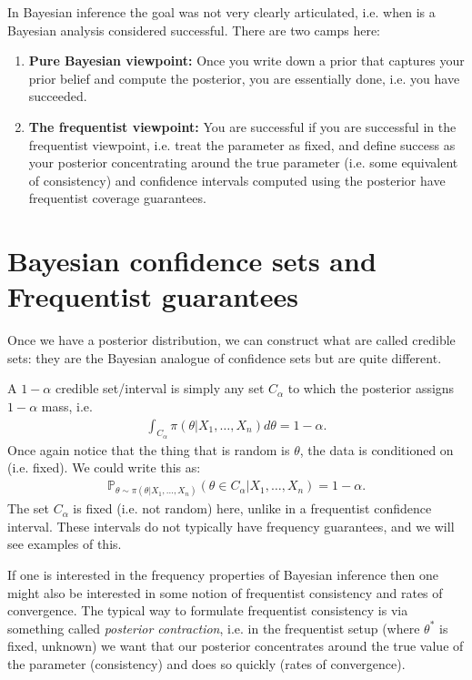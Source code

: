 \documentclass[twoside,12pt]{article}
\begin{document}
In Bayesian inference the goal was not very clearly articulated, i.e. when is a Bayesian analysis considered successful. There are two camps here:
\begin{enumerate}
\item {\bf Pure Bayesian viewpoint: } Once you write down a prior that captures your prior belief and compute the posterior, you are essentially done, i.e. you have succeeded.
\item {\bf The frequentist viewpoint: } You are successful if you are successful in the frequentist viewpoint, i.e. treat  the parameter as fixed, and define success as your posterior concentrating around the true parameter (i.e. some equivalent of consistency) and confidence intervals computed using the posterior have frequentist coverage guarantees.
\end{enumerate}

\section{Bayesian confidence sets and Frequentist guarantees}
Once we have a posterior distribution, we can construct what are called credible sets: they are the Bayesian analogue of confidence sets but are quite different.

A $1 - \alpha$ credible set/interval is simply any set $C_\alpha$ to which the posterior assigns $1 - \alpha$ mass, i.e.
\begin{align*}
\int_{C_\alpha} \pi(\theta | X_1,\ldots, X_n) d\theta = 1 - \alpha.
\end{align*}
Once again notice that the thing that is random is $\theta$, the data is conditioned on (i.e. fixed). We could write this as:
\begin{align*}
\mathbb{P}_{\theta \sim \pi(\theta| X_1,\ldots,X_n)} (\theta \in C_{\alpha} | X_1,\ldots,X_n) = 1 - \alpha.
\end{align*}
The set $C_\alpha$ is fixed (i.e. not random) here, unlike in a frequentist confidence interval. These intervals do not typically have frequency guarantees, and we will see examples of this.

If one is interested in the frequency properties of Bayesian inference then one might also be interested in some notion of frequentist consistency and rates of convergence. The typical way to formulate frequentist consistency is via something called \emph{posterior contraction}, i.e. in the frequentist setup (where $\theta^*$ is fixed, unknown) we want that our posterior concentrates around the true value of the parameter (consistency) and does so quickly (rates of convergence). 
\end{document}
